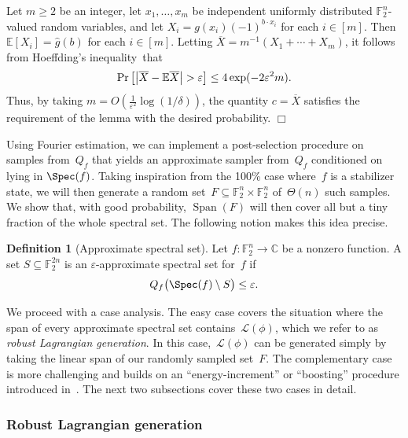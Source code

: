 \documentclass[11pt]{amsart}
\renewcommand{\Pr}{\mathop{\mbox{\rm Pr}}}
\newcommand{\E}{\mathbb{E}}
\newcommand{\C}{\mathbb{C}} %
\newcommand{\F}{\mathbb{F}} %
\DeclareMathOperator{\vspan}{Span} %
\newcommand{\eps}{\varepsilon}
\theoremstyle{plain}
\theoremstyle{definition}
\newtheorem{definition}[theorem]{Definition}
\theoremstyle{remark}
\renewenvironment{proof}[1][]{
    	\begin{trivlist}
     	\item[\hspace{\labelsep}{\em\noindent Proof#1:\/}]}
     	{{\hfill$\Box$}
    	\end{trivlist}
  }
\begin{document}
\begin{proof}
Let $m \geq 2$ be an integer, let $x_1,\dots,x_m$ be independent uniformly distributed $\F_2^n$-valued random variables, and let $X_i = g(x_i)(-1)^{b\cdot x_i}$ for each $i\in[m]$.
Then $\E[X_i] = \widehat{g}(b)$ for each $i\in [m]$.
Letting $\overline X = m^{-1}(X_1 + \cdots + X_m)$, it follows from Hoeffding's inequality~that
\begin{equation*}
    \Pr\big[\big|\overline{X} - \E\overline{X}\big| > \eps\big] \leq 4\exp(-2\eps^2m).
\end{equation*}
Thus, by taking $m=O(\frac{1}{\eps^2}\log(1/\delta))$, the quantity $c = \overline{X}$ satisfies the requirement of the lemma with the desired probability.
\end{proof}

Using Fourier estimation, we can implement a post-selection procedure on samples from~$Q_f$ that yields an approximate sampler from~$Q_f$  conditioned on lying in $\Spec(f)$.
Taking inspiration from the 100\% case where~$f$ is a stabilizer state, we will then generate a random set~$F\subseteq \F_2^n\times\F_2^n$ of~$\Theta(n)$ such samples.
We show that, with good probability, $\vspan(F)$ will then cover all but a tiny fraction of the whole spectral set.
The following notion makes this idea precise.

\begin{definition}[Approximate spectral set]
    Let $f:\F_2^n\to \C$ be a nonzero function.
    A set $S\subseteq \F_2^{2n}$ is an $\eps$-approximate spectral set for~$f$ if 
    \begin{equation*}
        Q_f\big(\Spec(f)\setminus S\big) \leq \eps.
    \end{equation*}
\end{definition}


We proceed with a case analysis.
The easy case covers the situation where the span of every approximate spectral set contains~$\mathcal L(\phi)$, which we refer to as \emph{robust Lagrangian generation}.
In this case,~$\mathcal L(\phi)$ can be generated simply by taking the linear span of our randomly sampled set~$F$.
The complementary case is more challenging and builds on an ``energy-increment''   or ``boosting'' procedure introduced in~\cite{chen2024stabilizer}.
The next two subsections cover these two cases in detail.


\subsubsection{Robust Lagrangian generation}
\end{document}
